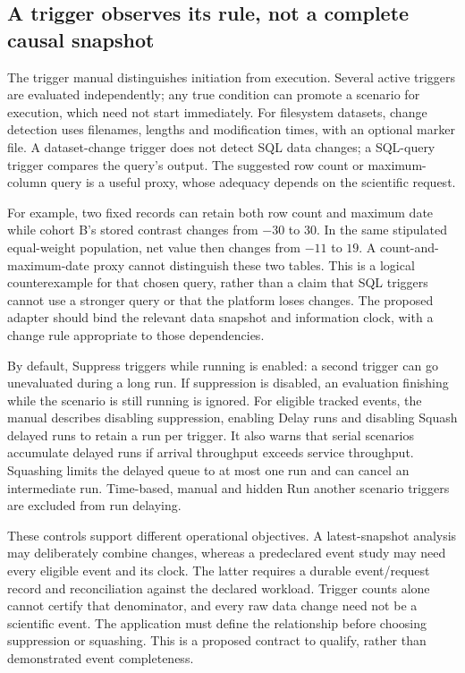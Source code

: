 \subsection{A trigger observes its rule, not a complete causal snapshot}

The trigger manual distinguishes initiation from execution. Several active
triggers are evaluated independently; any true condition can promote a scenario
for execution, which need not start immediately. For filesystem datasets,
change detection uses filenames, lengths and modification times, with an
optional marker file. A dataset-change trigger does not detect SQL data
changes; a SQL-query trigger compares the query's output. The suggested row
count or maximum-column query is a useful proxy, whose adequacy depends on the
scientific request.\citep{exec23_dss_latest_triggers}

For example, two fixed records can retain both row count and maximum date
while cohort B's stored contrast changes from $-30$ to $30$. In the same
stipulated equal-weight population, net value then changes from $-11$ to $19$.
A count-and-maximum-date proxy cannot distinguish these two tables. This is a
logical counterexample for that chosen query, rather than a claim that SQL
triggers cannot use a stronger query or that the platform loses changes.
The proposed adapter should bind the relevant data snapshot and information
clock, with a change rule appropriate to those dependencies.
\citep{exec23_dss_denominator_reference}

By default, Suppress triggers while running is enabled: a second trigger can
go unevaluated during a long run. If suppression is disabled, an evaluation
finishing while the scenario is still running is ignored. For eligible tracked
events, the manual describes disabling suppression, enabling Delay runs and
disabling Squash delayed runs to retain a run per trigger. It also warns that
serial scenarios accumulate delayed runs if arrival throughput exceeds service
throughput. Squashing limits the delayed queue to at most one run and can
cancel an intermediate run. Time-based, manual and hidden Run another scenario
triggers are excluded from run delaying.
\citep{exec23_dss_latest_triggers}

These controls support different operational objectives. A latest-snapshot
analysis may deliberately combine changes, whereas a predeclared event study
may need every eligible event and its clock. The latter requires a durable
event/request record and reconciliation against the declared workload.
Trigger counts alone cannot certify that denominator, and every raw data
change need not be a scientific event. The application must define the
relationship before choosing suppression or squashing. This is a proposed
contract to qualify, rather than demonstrated event completeness.

